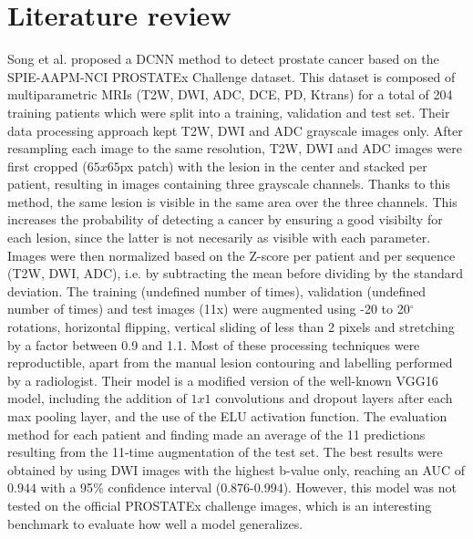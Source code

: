 
\chapter{Literature review}
\label{ch:literature_review}

Song et al. \cite{07} proposed a DCNN method to detect prostate cancer based on the SPIE-AAPM-NCI PROSTATEx Challenge dataset. This dataset is composed of multiparametric MRIs (T2W, DWI, ADC, DCE, PD, Ktrans) for a total of 204 training patients which were split into a training, validation and test set. Their data processing approach kept T2W, DWI and ADC grayscale images only. After resampling each image to the same resolution, T2W, DWI and ADC images were first cropped ($65x65$px patch) with the lesion in the center and stacked per patient, resulting in images containing three grayscale channels. Thanks to this method, the same lesion is visible in the same area over the three channels. This increases the probability of detecting a cancer by ensuring a good visibilty for each lesion, since the latter is not necesarily as visible with each parameter. Images were then normalized based on the Z-score per patient and per sequence (T2W, DWI, ADC), i.e. by subtracting the mean before dividing by the standard deviation. The training (undefined number of times), validation (undefined number of times) and test images (11x) were augmented using -20 to 20$^\circ$ rotations, horizontal flipping, vertical sliding of less than 2 pixels and stretching by a factor between 0.9 and 1.1. Most of these processing techniques were reproductible, apart from the manual lesion contouring and labelling performed by a radiologist. 
Their model is a modified version of the well-known VGG16 model, including the addition of $1x1$ convolutions and dropout layers after each max pooling layer, and the use of the ELU activation function. The evaluation method for each patient and finding made an average of the 11 predictions resulting from the 11-time augmentation of the test set. The best results were obtained by using DWI images with the highest b-value only, reaching an AUC of $0.944$ with a 95$\%$ confidence interval ($0.876$-$0.994$). However, this model was not tested on the official PROSTATEx challenge images, which is an interesting benchmark to evaluate how well a model generalizes.

